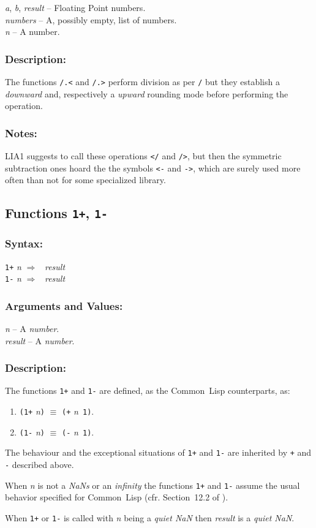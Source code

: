 \documentclass[10pt,fleqn]{article}
\newcommand{\CL}{\textsf{Common~Lisp}}
\newcommand{\code}[1]{\texttt{#1}}
\newcommand{\clieeeterm}[1]{\textit{#1}}
\newcommand{\varname}[1]{\textit{#1}}
\newcommand{\clterm}[1]{\textit{#1}}
\newcommand{\RArrow}{$\Rightarrow$}
\newcommand{\DDictionaryItem}[1]{\vspace*{6pt}\noindent\hrulefill\vspace*{-9pt}\subsection*{#1}}
\newcommand{\DSyntax}{\subsubsection*{Syntax:}}
\newcommand{\DArgsNValues}{\subsubsection*{Arguments and Values:}}
\newcommand{\DDescription}{\subsubsection*{Description:}}
\newcommand{\DNotes}{\subsubsection*{Notes:}}
\begin{document}
\varname{a}, \varname{b}, \varname{result} -- Floating Point numbers.\\
\varname{numbers} -- A, possibly empty, list of numbers.\\
\varname{n} -- A number.

\DDescription{}

The functions  \code{/.<} and \code{/.>} perform division as per \code{/}
but they establish a \emph{downward} and, respectively a
\emph{upward} rounding mode before performing the operation.

\DNotes{}

LIA1 suggests to call these operations \code{</} and \code{/>}, but
then the symmetric subtraction ones hoard the the symbols \code{<-}
and \code{->}, which are surely used more often than not for some
specialized library.



\DDictionaryItem{Functions \code{1+}, \code{1-}}
\index{*!\code{1+}}
\index{*!\code{1-}}

\DSyntax{}

\code{1+} \varname{n} \RArrow ~ \varname{result}\\
\code{1-} \varname{n} \RArrow ~ \varname{result}\\

\DArgsNValues{}

\varname{n} -- A \clterm{number}.\\
\varname{result} -- A \clterm{number}.


\DDescription{}

The functions \code{1+} and \code{1-} are defined, 
as the \CL{} counterparts, as:
\begin{enumerate}
\item \code{(1+}
\varname{n}\code{)} $\equiv$ \code{(+}
\varname{n}\code{ 1)}.
\item \code{(1-}
\varname{n}\code{)} $\equiv$ \code{(-}
\varname{n}\code{ 1)}.
\end{enumerate}

The behaviour and the exceptional situations of \code{1+} and
\code{1-} are inherited by \code{+} and \code{-} described above.

When \varname{n} is not a \clieeeterm{NaNs} or an
\clieeeterm{infinity} the functions \code{1+} and \code{1-}
assume the usual behavior specified for \CL{} (cfr.
Section~12.2 of \cite{1996:ANSIHyperSpec}).

When \code{1+} or \code{1-} is called with \varname{n} being a
\clieeeterm{quiet NaN} then \varname{result} is a \clieeeterm{quiet NaN}.
\end{document}
